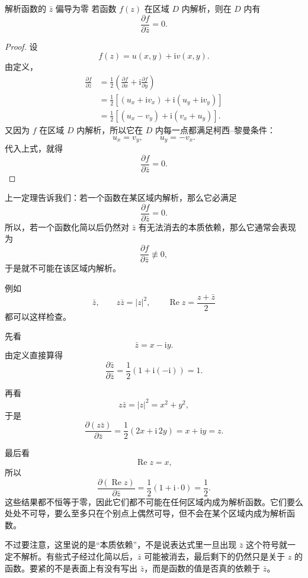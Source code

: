 \begin{dingli}{解析函数的 $\bar z$ 偏导为零}{}
若函数 $f(z)$ 在区域 $D$ 内解析，则在 $D$ 内有
\[
    \frac{\partial f}{\partial \bar z}=0.
\]
\end{dingli}

\begin{proof}
设
\[
    f(z)=u(x,y)+\mathrm{i}v(x,y).
\]
由定义，
\begin{align*}
    \frac{\partial f}{\partial \bar z}
    &=\frac12\left(\frac{\partial f}{\partial x}
    +\mathrm{i}\frac{\partial f}{\partial y}\right)\\
    &=\frac12\left[(u_x+\mathrm{i}v_x)+\mathrm{i}(u_y+\mathrm{i}v_y)\right]\\
    &=\frac12\left[(u_x-v_y)+\mathrm{i}(v_x+u_y)\right].
\end{align*}
又因为 $f$ 在区域 $D$ 内解析，所以它在 $D$ 内每一点都满足柯西--黎曼条件：
\[
    u_x=v_y,\qquad u_y=-v_x.
\]
代入上式，就得
\[
    \frac{\partial f}{\partial \bar z}=0.
\]
\end{proof}

\begin{jinshi}
上一定理告诉我们：若一个函数在某区域内解析，那么它必满足
\[
    \frac{\partial f}{\partial \bar z}=0.
\]
所以，若一个函数化简以后仍然对 $\bar z$ 有无法消去的本质依赖，那么它通常会表现为
\[
    \frac{\partial f}{\partial \bar z}\not\equiv 0,
\]
于是就不可能在该区域内解析。

例如
\[
    \bar z,\qquad z\bar z=|z|^2,\qquad \operatorname{Re}z=\frac{z+\bar z}{2}
\]
都可以这样检查。

先看
\[
    \bar z=x-\mathrm{i}y.
\]
由定义直接算得
\[
    \frac{\partial \bar z}{\partial \bar z}
    =\frac12\left(1+\mathrm{i}(-\mathrm{i})\right)=1.
\]

再看
\[
    z\bar z=|z|^2=x^2+y^2,
\]
于是
\[
    \frac{\partial (z\bar z)}{\partial \bar z}
    =\frac12\left(2x+\mathrm{i}\,2y\right)
    =x+\mathrm{i}y
    =z.
\]

最后看
\[
    \operatorname{Re}z=x,
\]
所以
\[
    \frac{\partial (\operatorname{Re}z)}{\partial \bar z}
    =\frac12(1+\mathrm{i}\cdot 0)
    =\frac12.
\]
这些结果都不恒等于零，因此它们都不可能在任何区域内成为解析函数。它们要么处处不可导，要么至多只在个别点上偶然可导，但不会在某个区域内成为解析函数。

不过要注意，这里说的是``本质依赖''，不是说表达式里一旦出现 $\bar z$ 这个符号就一定不解析。有些式子经过化简以后，$\bar z$ 可能被消去，最后剩下的仍然只是关于 $z$ 的函数。要紧的不是表面上有没有写出 $\bar z$，而是函数的值是否真的依赖于 $\bar z$。
\end{jinshi}

